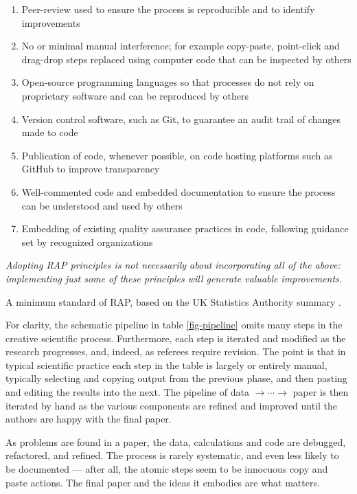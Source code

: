 \documentclass{comjnl}
\begin{document}
\begin{table*}
{\sf
\newcount \enum
{}
\renewcommand{\theenumi}{%
\the\enum
\global\advance \enum by 1}
\begin{enumerate}
\item
Peer-review used to ensure the process is reproducible and to identify improvements 
\item
No or minimal manual interference;
for example copy-paste, point-click and drag-drop steps replaced using computer code that can be inspected by others 
\item
Open-source programming languages so that processes do not rely on proprietary software and can be reproduced by others
\item
Version control software, such as Git, to guarantee an audit trail of changes made to code 
\item
Publication of code, whenever possible, on code hosting platforms such as GitHub to improve transparency 
\item
Well-commented code and embedded documentation to ensure the process can be understood and used by others 
\item
Embedding of existing quality assurance practices in code, following guidance set by recognized organizations 
\end{enumerate}
\emph{Adopting RAP principles is not necessarily about incorporating all of the above: implementing just some of these principles will generate valuable improvements.}
}\caption{A minimum standard of RAP, based on the UK Statistics Authority summary \cite{RAPstandard}.}
\label{figure-RAP-summary}
\end{table*}

For clarity, the schematic pipeline in table \ref{fig-pipeline} omits many steps in the creative scientific process. Furthermore, each step is iterated and modified as the research progresses, and, indeed, as referees require revision. The point is that in typical scientific practice each step in the table is largely or entirely manual, typically selecting and copying output from the previous phase, and then pasting and editing the results into the next. The pipeline of data $\rightarrow\cdots\rightarrow$ paper is then iterated by hand as the various components are refined and improved until the authors are happy with the final paper. 

As problems are found in a paper, the data, calculations and code are debugged, refactored, and refined. The process is rarely systematic, and even less likely to be documented --- after all, the atomic steps seem to be innocuous copy and paste actions. The final paper and the ideas it embodies are what matters.
\end{document}
